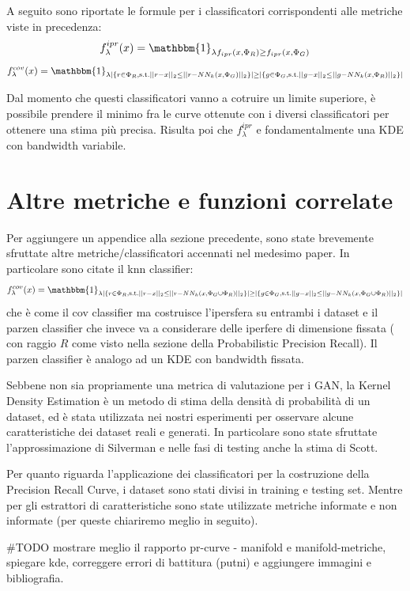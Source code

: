 A seguito sono riportate le formule per i classificatori corrispondenti alle metriche viste in precedenza:
\begin{equation}
    f_{\lambda}^{ipr}(x) = \mathbbm{1}_{\lambda f_{ipr}(x, \Phi_R) \geq f_{ipr}(x, \Phi_G)}
\end{equation}
\begin{equation}
    f_{\lambda}^{cov}(x) = \mathbbm{1}_{\lambda |\{ r \in \Phi_R, \text{s.t.} ||r - x||_2 \leq ||r - NN_k(x, \Phi_G)||_2 \}| \geq |\{ g \in \Phi_G, \text{s.t.} ||g - x||_2 \leq ||g - NN_k(x, \Phi_R)||_2 \}|}
\end{equation}

Dal momento che questi classificatori vanno a cotruire un limite superiore, è possibile prendere il minimo fra le curve ottenute con i diversi classificatori per ottenere una stima più precisa.
Risulta poi che $f^{ipr}_{\lambda}$ e fondamentalmente una KDE con bandwidth variabile.

\section{Altre metriche e funzioni correlate}
\label{sec:altre-metriche}

Per aggiungere un appendice alla sezione precedente, sono state brevemente sfruttate altre metriche/classificatori accennati nel medesimo paper. In particolare sono citate il knn classifier:
\begin{equation}
    f_{\lambda}^{cov}(x) = \mathbbm{1}_{\lambda |\{ r \in \Phi_R, \text{s.t.} ||r - x||_2 \leq ||r - NN_k(x, \Phi_G \cup \Phi_R)||_2 \}| \geq |\{ g \in \Phi_G, \text{s.t.} ||g - x||_2 \leq ||g - NN_k(x, \Phi_G \cup \Phi_R)||_2 \}|}
\end{equation}
che è come il cov classifier ma costruisce l'ipersfera su entrambi i dataset e il parzen classifier che invece va a considerare delle iperfere di dimensione fissata ( con raggio $R$ come visto nella sezione della Probabilistic Precision Recall).
Il parzen classifier è analogo ad un KDE con bandwidth fissata.

Sebbene non sia propriamente una metrica di valutazione per i GAN, la Kernel Density Estimation è un metodo di stima della densità di probabilità di un dataset, ed è stata utilizzata nei nostri esperimenti per osservare alcune caratteristiche dei dataset reali e generati.
In particolare sono state sfruttate l'approssimazione di Silverman e nelle fasi di testing anche la stima di Scott.

Per quanto riguarda l'applicazione dei classificatori per la costruzione della Precision Recall Curve, i dataset sono stati divisi in training e testing set. Mentre per gli estrattori di caratteristiche sono state utilizzate metriche informate e non informate (per queste chiariremo meglio in seguito).

#TODO mostrare meglio il rapporto pr-curve - manifold e manifold-metriche, spiegare kde, correggere errori di battitura (putni) e aggiungere immagini e bibliografia.